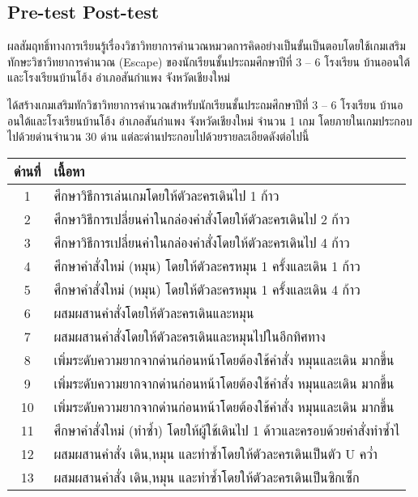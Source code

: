 \subsection{Pre-test Post-test}
ผลสัมฤทธิ์ทางการเรียนรู้เรื่องวิชาวิทยาการคำนวณหมวดการคิดอย่างเป็นขั้นเป็นตอบโดยใช้เกมเสริมทักษะวิชาวิทยาการคำนวณ (Escape) ของนักเรียนชั้นประถมศึกษาปีที่ 3 – 6
โรงเรียน บ้านออนใต้และโรงเรียนบ้านโฮ้ง อำเภอสันกำแพง จังหวัดเชียงใหม่\par
ได้สร้างเกมเสริมทักวิชาวิทยาการคำนวณสำหรับนักเรียนชั้นประถมศึกษาปีที่ 3 – 6 โรงเรียน
บ้านออนใต้และโรงเรียนบ้านโฮ้ง อำเภอสันกำแพง จังหวัดเชียงใหม่ จำนวน 1 เกม
โดยภายในเกมประกอบไปด้วยด่านจำนวน 30 ด่าน
แต่ละด่านประกอบไปด้วยรายละเอียดดังต่อไปนี้\par
\begin{center}
    \begin{tabular}{|c | m{35em}|} 
     \hline
     ด่านที่ & เนื้อหา\\ [0.5ex] 
     \hline\hline
     1 &  ศึกษาวิธีการเล่นเกมโดยให้ตัวละครเดินไป 1 ก้าว \\ 
     \hline
     2 &  ศึกษาวิธีการเปลี่ยนค่าในกล่องคำสั่งโดยให้ตัวละครเดินไป 2 ก้าว \\ 
     \hline
     3 &  ศึกษาวิธีการเปลี่ยนค่าในกล่องคำสั่งโดยให้ตัวละครเดินไป 4 ก้าว \\ 
     \hline
     4 &  ศึกษาคำสั่งใหม่ (หมุน) โดยให้ตัวละครหมุน 1 ครั้งและเดิน 1 ก้าว \\ 
     \hline
     5 &  ศึกษาคำสั่งใหม่ (หมุน) โดยให้ตัวละครหมุน 1 ครั้งและเดิน 4 ก้าว \\ 
     \hline
     6 &  ผสมผสานคำสั่งโดยให้ตัวละครเดินและหมุน \\ 
     \hline
     7 &  ผสมผสานคำสั่งโดยให้ตัวละครเดินและหมุนไปในอีกทิศทาง \\ 
     \hline
     8 &  เพิ่มระดับความยากจากด่านก่อนหน้าโดยต้องใช้คำสั่ง หมุนและเดิน มากขึ้น \\ 
     \hline
     9 &  เพิ่มระดับความยากจากด่านก่อนหน้าโดยต้องใช้คำสั่ง หมุนและเดิน มากขึ้น \\ 
     \hline
     10 &  เพิ่มระดับความยากจากด่านก่อนหน้าโดยต้องใช้คำสั่ง หมุนและเดิน มากขึ้น \\ 
     \hline
     11 &  ศึกษาคำสั่งใหม่ (ทำซ้ำ) โดยให้ผู้ใช้เดินไป 1 ด้าวและครอบด้วยคำสั่งทำซ้ำไ \\ 
     \hline
     12 &  ผสมผสานคำสั่ง เดิน,หมุน และทำซ้ำโดยให้ตัวละครเดินเป็นตัว U คว่ำ \\ 
     \hline
     13 &  ผสมผสานคำสั่ง เดิน,หมุน และทำซ้ำโดยให้ตัวละครเดินเป็นซิกเซ็ก \\ 

\end{tabular}
\end{center}

